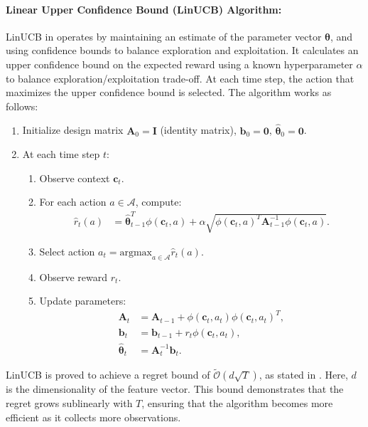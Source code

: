 \paragraph{Linear Upper Confidence Bound (LinUCB) Algorithm:}
LinUCB in \citet{dani2008stochastic, li2010contextual} operates by maintaining an estimate of the parameter vector $\boldsymbol{\theta}$, and using confidence bounds to balance exploration and exploitation. It calculates an upper confidence bound on the expected reward using a known hyperparameter $\alpha$ to balance exploration/exploitation trade-off. At each time step, the action that maximizes the upper confidence bound is selected. The algorithm works as follows:
    \begin{enumerate}
        \item Initialize design matrix $\mathbf{A}_0 = \mathbf{I}$ (identity matrix), $\mathbf{b}_0 = \mathbf{0}$, $\hat{\boldsymbol{\theta}}_0 = \mathbf{0}$.
        \item At each time step $t$:
          \begin{enumerate}
              \item Observe context $\mathbf{c}_t$.
              \item For each action $a \in \mathcal{A}$, compute:
              \begin{align*}
                \hat{r}_t(a) &= \hat{\boldsymbol{\theta}}_{t-1}^T \phi(\mathbf{c}_t, a) + \alpha \sqrt{ \phi(\mathbf{c}_t, a)^T \mathbf{A}_{t-1}^{-1} \phi(\mathbf{c}_t, a)}.
              \end{align*}
              \item Select action $a_t = \text{argmax}_{a \in \mathcal{A}} \hat{r}_t(a)$.
              \item Observe reward $r_t$.
              \item Update parameters:
              \begin{align*}
                  \mathbf{A}_t &= \mathbf{A}_{t-1} + \phi(\mathbf{c}_t, a_t) \phi(\mathbf{c}_t, a_t)^T, \\
                  \mathbf{b}_t &= \mathbf{b}_{t-1} + r_t \phi(\mathbf{c}_t, a_t), \\
                  \hat{\boldsymbol{\theta}}_t &= \mathbf{A}_t^{-1} \mathbf{b}_t.
              \end{align*}
          \end{enumerate}
    \end{enumerate}
LinUCB is proved to achieve a regret bound of \( \tilde{\mathcal{O}}(d \sqrt{T}) \), as stated in \citet{dani2008stochastic}. Here, \( d \) is the dimensionality of the feature vector. This bound demonstrates that the regret grows sublinearly with \( T \), ensuring that the algorithm becomes more efficient as it collects more observations.

